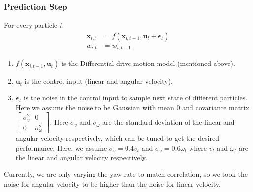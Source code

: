 \documentclass[a4paper]{article}
\begin{document}
\subsubsection{Prediction Step}
For every particle $i$:
\begin{equation}
    \begin{aligned}
        \mathbf{x}_{i,t} &= f(\mathbf{x}_{i,t-1}, \mathbf{u}_t + \mathbf{\epsilon}_t) \\
        w_{i,t} &= w_{i,t-1}
    \end{aligned}
\end{equation}
\begin{enumerate}
    \item $f(\mathbf{x}_{i,t-1}, \mathbf{u}_t)$ is the Differential-drive motion model (mentioned above).
    \item $\mathbf{u}_t$ is the control input (linear and angular velocity).
    \item $\mathbf{\epsilon}_t$ is the noise in the control input to sample next state of different particles. Here we assume the noise to be Gaussian with mean 0 and covariance matrix $\begin{bmatrix}\sigma_v^2 & 0 \\ 0 & \sigma_\omega^2\end{bmatrix}$. Here $\sigma_v$ and $\sigma_\omega$ are the standard deviation of the linear and angular velocity respectively, which can be tuned to get the desired performance. Here, we assume $\sigma_v = 0.4 v_t$ and $\sigma_\omega = 0.6 \omega_t$ where $v_t$ and $\omega_t$ are the linear and angular velocity respectively.
\end{enumerate}
Currently, we are only varying the yaw rate to match correlation, so we took the noise for angular velocity to be higher than the noise for linear velocity.
\end{document}
